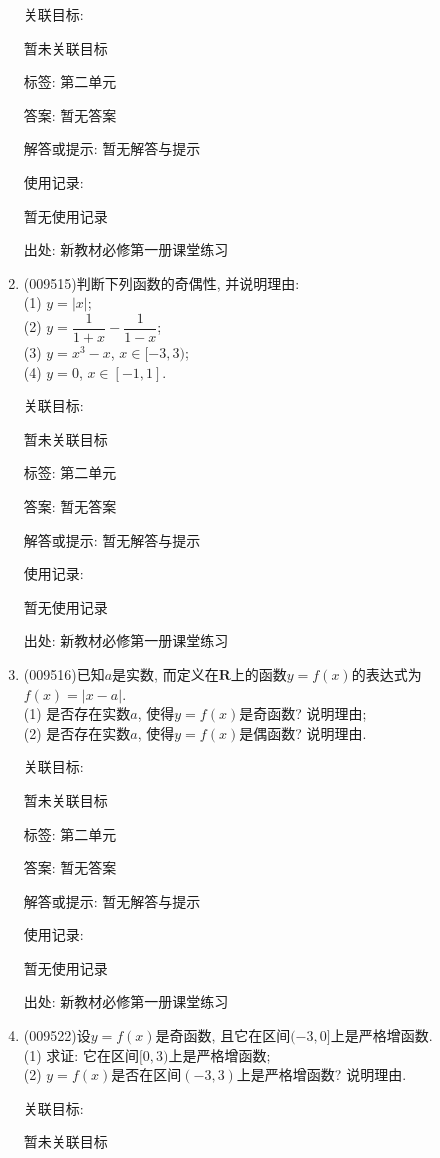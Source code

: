 \documentclass[10pt,a4paper]{article}
\begin{document}
\begin{enumerate}[1.]
关联目标:

暂未关联目标



标签: 第二单元

答案: 暂无答案

解答或提示: 暂无解答与提示

使用记录:

暂无使用记录


出处: 新教材必修第一册课堂练习
\item { (009515)}判断下列函数的奇偶性, 并说明理由:\\
(1) $y=|x|$;\\
(2) $y=\dfrac 1{1+x}-\dfrac 1{1-x}$;\\
(3) $y=x^3-x$, $x\in [-3, 3)$;\\
(4) $y=0$, $x\in [-1, 1]$.


关联目标:

暂未关联目标



标签: 第二单元

答案: 暂无答案

解答或提示: 暂无解答与提示

使用记录:

暂无使用记录


出处: 新教材必修第一册课堂练习
\item { (009516)}已知$a$是实数, 而定义在$\mathbf{R}$上的函数$y=f(x)$的表达式为$f(x)=|x-a|$.\\
(1) 是否存在实数$a$, 使得$y=f(x)$是奇函数? 说明理由;\\
(2) 是否存在实数$a$, 使得$y=f(x)$是偶函数? 说明理由.


关联目标:

暂未关联目标



标签: 第二单元

答案: 暂无答案

解答或提示: 暂无解答与提示

使用记录:

暂无使用记录


出处: 新教材必修第一册课堂练习
\item { (009522)}设$y=f(x)$是奇函数, 且它在区间$(-3, 0]$上是严格增函数.\\
(1) 求证: 它在区间$[0, 3)$上是严格增函数;\\
(2) $y=f(x)$是否在区间$(-3, 3)$上是严格增函数? 说明理由.


关联目标:

暂未关联目标




\end{enumerate}
\end{document}

